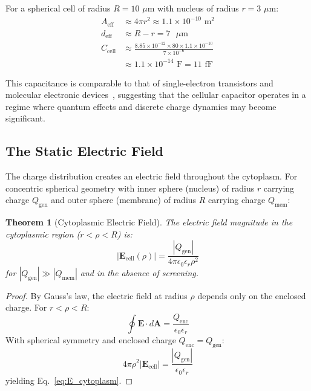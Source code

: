 \documentclass[twocolumn,10pt,aps,prd,superscriptaddress,floatfix,nofootinbib]{revtex4-2}
\newtheorem{theorem}{Theorem}[section]
\theoremstyle{remark}
\begin{document}
For a spherical cell of radius $R = 10$ $\mu$m with nucleus of radius $r = 3$ $\mu$m:
\begin{align}
A_{\mathrm{eff}} &\approx 4\pi r^2 \approx 1.1 \times 10^{-10} \text{ m}^2 \\
d_{\mathrm{eff}} &\approx R - r = 7 \text{ $\mu$m} \\
C_{\mathrm{cell}} &\approx \frac{8.85 \times 10^{-12} \times 80 \times 1.1 \times 10^{-10}}{7 \times 10^{-6}} \nonumber \\
&\approx 1.1 \times 10^{-14} \text{ F} = 11 \text{ fF}
\end{align}

This capacitance is comparable to that of single-electron transistors and molecular electronic devices~\cite{Likharev1999}, suggesting that the cellular capacitor operates in a regime where quantum effects and discrete charge dynamics may become significant.

\subsection{The Static Electric Field}

The charge distribution creates an electric field throughout the cytoplasm. For concentric spherical geometry with inner sphere (nucleus) of radius $r$ carrying charge $Q_{\mathrm{gen}}$ and outer sphere (membrane) of radius $R$ carrying charge $Q_{\mathrm{mem}}$:

\begin{theorem}[Cytoplasmic Electric Field]
\label{thm:E_field}
The electric field magnitude in the cytoplasmic region ($r < \rho < R$) is:
\begin{equation}
|\mathbf{E}_{\mathrm{cell}}(\rho)| = \frac{|Q_{\mathrm{gen}}|}{4\pi\epsilon_0\epsilon_r\rho^2}
\label{eq:E_cytoplasm}
\end{equation}
for $|Q_{\mathrm{gen}}| \gg |Q_{\mathrm{mem}}|$ and in the absence of screening.
\end{theorem}

\begin{proof}
By Gauss's law, the electric field at radius $\rho$ depends only on the enclosed charge. For $r < \rho < R$:
\begin{equation}
\oint \mathbf{E} \cdot d\mathbf{A} = \frac{Q_{\mathrm{enc}}}{\epsilon_0\epsilon_r}
\end{equation}
With spherical symmetry and enclosed charge $Q_{\mathrm{enc}} = Q_{\mathrm{gen}}$:
\begin{equation}
4\pi\rho^2 |\mathbf{E}_{\mathrm{cell}}| = \frac{|Q_{\mathrm{gen}}|}{\epsilon_0\epsilon_r}
\end{equation}
yielding Eq.~\eqref{eq:E_cytoplasm}.
\end{proof}
\end{document}
